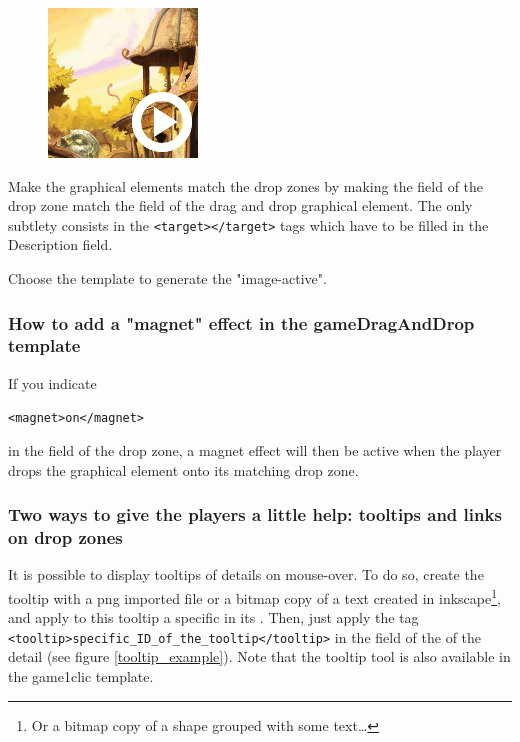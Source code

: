\begin{figure}
  \centering
  \includegraphics[scale=0.7]{./images/gameDragAndDrop} 
\end{figure}


Make the graphical elements match the drop zones by 
making the  field of the drop zone match
the  field of the drag and drop graphical element. 
The only subtlety consists in the  \verb|<target></target>| tags which have to be filled in the \chemin
{Description} field.

Choose the template  to generate the "image-active".



\subsubsection{How to add a "magnet" effect in the gameDragAndDrop template}

If you indicate\\
\begin{center}
\verb|<magnet>on</magnet>| 
\end{center}
in the  field of the drop zone, a 
magnet effect will then be active when the player drops the 
graphical element onto its matching drop zone.

\subsubsection{Two ways to give the players a little help: tooltips and links on drop zones}

It is possible to display tooltips of details on mouse-over. To do so, 
create the tooltip with a png imported file or a bitmap copy of a text created in 
inkscape\footnote{Or a bitmap copy of a shape grouped with some text\ldots}, and 
apply to this tooltip a specific  in its . Then, 
just apply the tag \verb|<tooltip>specific_ID_of_the_tooltip</tooltip>| in the 
 field of the  of the detail (see figure \ref{tooltip_example}).
Note that the tooltip tool is also available in the game1clic template.

